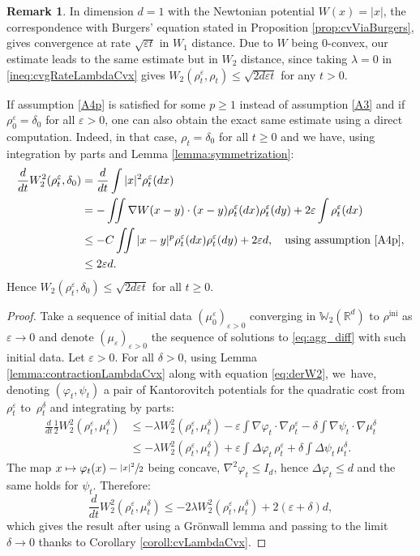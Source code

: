 \documentclass[11pt]{article}
\numberwithin{equation}{section}
\newcommand\mto{\mathchoice{\longmapsto}{\mapsto}{\mapsto}{\mapsto}}
\newcommand{\ini}{\mathrm{ini}}
\def\RR{\mathbb{R}}
\def\WW{\mathbb{W}}
\def\eps{\varepsilon}
\theoremstyle{plain}
\theoremstyle{definition}
\newtheorem{remark}[theorem]{Remark}
\begin{document}
\begin{remark}\label{rmk:burgers:1}
In dimension $d=1$ with the Newtonian potential $W(x) = |x|$, the correspondence with Burgers' equation stated in Proposition \ref{prop:cvViaBurgers}, gives convergence at rate $\sqrt{\eps t}$ in $W_1$ distance. Due to $W$ being $0$-convex, our estimate leads to the same estimate but in $W_2$ distance, since taking $\lambda = 0$ in \eqref{ineq:cvgRateLambdaCvx} gives $W_2(\rho_t^\eps, \rho_t) \leq \sqrt{2d\eps t}$ for any $t>0$.

If assumption \eqref{A4p} is satisfied for some $p\geq 1$ instead of assumption \eqref{A3} and if $\rho_0^\eps = \delta_0$ for all $\eps > 0$, one can also obtain the exact same estimate using a direct computation. Indeed, in that case, $\rho_t = \delta_0$ for all $t\geq 0$ and we have, using integration by parts and Lemma \ref{lemma:symmetrization}:
\begin{align*}
\frac{d}{dt} W_2^2(\rho_t^\eps, \delta_0) & = \frac{d}{dt} \int |x|^2 \rho_t^\eps(dx) \\
& = - \iint \nabla W(x-y) \cdot (x-y) \rho_t^\eps(dx) \rho_t^\eps(dy) + 2\eps \int \rho_t^\eps(dx) \\
& \leq -C\iint |x-y|^p \rho_t^\eps(dx) \rho_t^\eps(dy) + 2\eps d, \quad \text{using assumption \eqref{A4p}}, \\
& \leq 2\eps d.
\end{align*}
Hence $W_2(\rho_t^\eps, \delta_0) \leq \sqrt{2d\eps t}$ for all $t \geq 0$.
\end{remark}
\begin{proof}
Take a sequence of initial data $(\mu_0^\eps)_{\eps>0}$ converging in $\WW_2(\RR^d)$ to $\rho^{\ini}$ as $\eps \to 0$ and denote $(\mu_\eps)_{\eps >0}$ the sequence of solutions to \eqref{eq:agg_diff} with such initial data. Let $\eps >0$. For all $\delta >0$, using Lemma \ref{lemma:contractionLambdaCvx} along with equation \eqref{eq:derW2}, we~have, denoting $(\varphi_t, \psi_t)$ a pair of Kantorovitch potentials for the quadratic cost from~$\rho^\eps_t$ to~$\rho^\delta_t$ and integrating by parts:
\begin{align*}
\frac{d}{dt} \frac 12 W_2^2(\rho_t^\eps, \mu_t^\delta) &\leq -\lambda W_2^2(\rho_t^\eps, \mu_t^\delta) - \eps \int \nabla \varphi_t \cdot \nabla \rho_t^\eps - \delta \int \nabla \psi_t \cdot \nabla \mu_t^\delta \\
&\leq -\lambda W_2^2(\rho_t^\eps, \mu_t^\delta) + \eps \int \Delta \varphi_t \, \rho_t^\eps + \delta \int \Delta \psi_t \, \mu_t^\delta.
\end{align*}
The map $x \mto \varphi_t(x) - \sfrac{|x|^2}{2}$ being concave, $\nabla^2 \varphi_t \leq I_d$, hence $\Delta \varphi_t \leq d$ and the same holds for $\psi_t$. Therefore:
\[
\frac{d}{dt} W_2^2(\rho_t^\eps, \mu_t^\delta) \leq -2\lambda W_2^2(\rho_t^\eps, \mu_t^\delta) + 2(\eps + \delta)d,
\]
which gives the result after using a Grönwall lemma and passing to the limit $\delta \to 0$ thanks to Corollary \ref{coroll:cvLambdaCvx}.
\end{proof}
\end{document}
